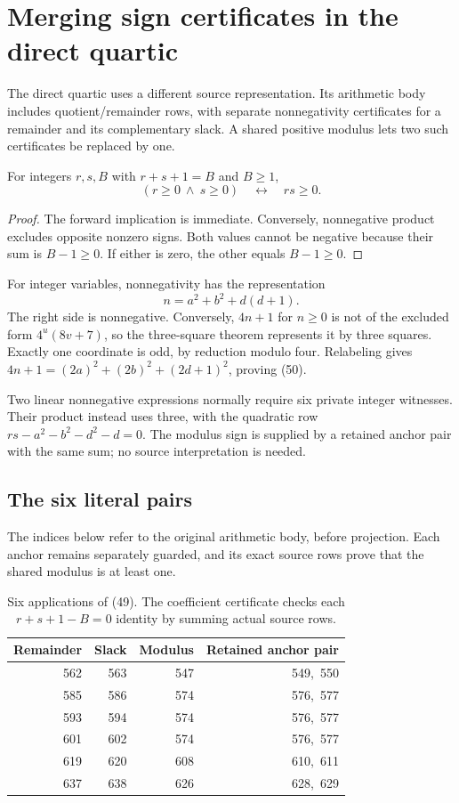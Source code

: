 \section{Merging sign certificates in the direct quartic}
\label{sec:guards}

The direct quartic uses a different source representation. Its arithmetic
body includes quotient/remainder rows, with separate nonnegativity
certificates for a remainder and its complementary slack. A shared positive
modulus lets two such certificates be replaced by one.

\begin{lemma}
\label{lem:guard}
For integers $r,s,B$ with $r+s+1=B$ and $B\ge1$,
\[
(r\ge0\ \land\ s\ge0)\quad\longleftrightarrow\quad rs\ge0.
\tag{49}
\]
\end{lemma}

\begin{proof}
The forward implication is immediate. Conversely, nonnegative product
excludes opposite nonzero signs. Both values cannot be negative because
their sum is $B-1\ge0$. If either is zero, the other equals $B-1\ge0$.
\end{proof}

For integer variables, nonnegativity has the representation
\[
n=a^2+b^2+d(d+1).
\tag{50}
\]
The right side is nonnegative. Conversely, $4n+1$ for $n\ge0$ is not
of the excluded form $4^u(8v+7)$, so the three-square theorem represents
it by three squares. Exactly one coordinate is odd, by reduction
modulo four. Relabeling gives
$4n+1=(2a)^2+(2b)^2+(2d+1)^2$, proving (50).

Two linear nonnegative expressions normally require six private integer
witnesses. Their product instead uses three, with the quadratic row
$rs-a^2-b^2-d^2-d=0$.
The modulus sign is supplied by a retained anchor pair with the same
sum; no source interpretation is needed.

\subsection{The six literal pairs}

The indices below refer to the original arithmetic body, before projection.
Each anchor remains separately guarded, and its exact source rows prove
that the shared modulus is at least one.

\begin{table}[ht]
\centering
\begin{tabular}{@{}rrrr@{}}
\toprule
Remainder & Slack & Modulus & Retained anchor pair\\
\midrule
562&563&547&549,\ 550\\
585&586&574&576,\ 577\\
593&594&574&576,\ 577\\
601&602&574&576,\ 577\\
619&620&608&610,\ 611\\
637&638&626&628,\ 629\\
\bottomrule
\end{tabular}
\caption{Six applications of (49). The coefficient certificate checks
each $r+s+1-B=0$ identity by summing actual source rows.}
\label{tab:guards}
\end{table}

